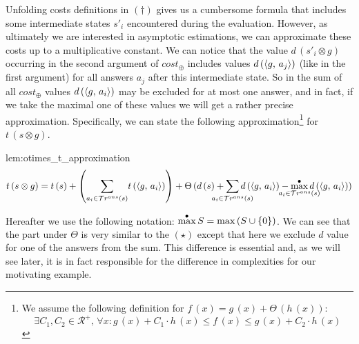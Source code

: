 Unfolding costs definitions in $(\dagger)$ gives us a cumbersome formula that 
includes some intermediate states $s'_i$ encountered during the evaluation. However, as ultimately
we are interested in asymptotic estimations, we can approximate these costs up to a multiplicative constant. We can notice that the value $d\,(s'_i \otimes g)$ occurring in the second argument of $cost_{\oplus}$ includes values $d\,(\langle g ,\, a_j \rangle)$ (like in the first argument) for all answers $a_j$ after this intermediate state. So in the sum of all $cost_{\oplus}$ values $d\,(\langle g ,\, a_i \rangle)$ may be excluded for at most one answer, and in fact, if we take the maximal one of these values we will get a rather precise approximation. Specifically, we can state the following approximation\footnote{We assume the following definition for
$f\,(x) = g\,(x) + \Theta\,(h\,(x))$: \[\exists C_1, C_2 \in \mathcal{R^{+}}, \, \forall x : g\,(x) + C_1 \cdot h\,(x) \le f\,(x) \le g\,(x) + C_2 \cdot h\,(x) \]}
for $t\,(s \otimes g)$.

\begin{replemma}{lem:otimes_t_approximation}
\[
 t\,(s \otimes g)  =  t\,(s) + \left({\sum\limits_{a_i \in \tra{s}}} t\,(\taskst{g}{a_i})\right) +
 \Theta\,(d\,(s) + \smashoperator[lr]{\sum\limits_{a_i \in \tra{s}}} d\,(\taskst{g}{a_i}) - \smashoperator{\maxd\limits_{a_i \in \tra{s}}} d\,(\taskst{g}{a_i}))	
\]
\end{replemma}

Hereafter we use the following notation: $\displaystyle{\max^{\bullet}}\, S = \max\,(S\cup\{0\})$.
We can see that the part under $\Theta$ is very similar to the $(\star)$ except that here we exclude $d$ value for one of the answers from the sum.
This difference is essential and, as we will see later, it is in fact responsible for the difference in complexities for our motivating example.
 

